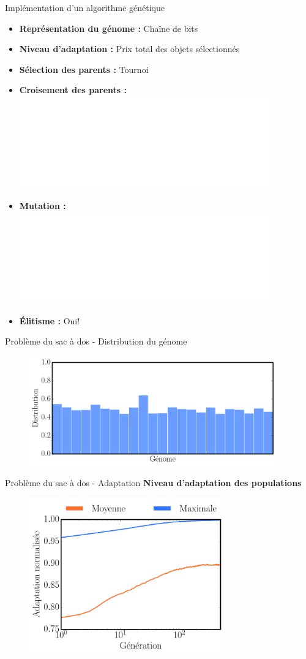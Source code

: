 \begin{frame}{Implémentation d'un algorithme génétique}
\vspace{-10pt}
\begin{itemize}
  \item \textbf{Représentation du génome : } Chaîne de bits
  \item \textbf{Niveau d'adaptation :} Prix total des objets sélectionnés 
  \item \textbf{Sélection des parents : } Tournoi
  \item \textbf{Croisement des parents : } \\ \vspace{5pt}
  \includegraphics<1>[width=0.85\textwidth]{figures/croisement.pdf}
  \item \textbf{Mutation :} \\ \vspace{5pt}
  \includegraphics<1>[width=0.85\textwidth]{figures/mutation.pdf}
  \item \textbf{Élitisme :} Oui!
\end{itemize}
  
\end{frame}

\begin{frame}{Problème du sac à dos - Distribution du génome}
  \begin{figure}[h!]
    \centering
    \href{run:figures/genome_dist.mp4}{\includegraphics[width=0.95\textwidth]{figures/genome_dist.pdf}}
  \end{figure}
\end{frame}

\begin{frame}{Problème du sac à dos - Adaptation}
\vspace{-10pt}
\textbf{Niveau d'adaptation des populations}
  \begin{figure}[h!]
    \centering
    \includegraphics[width=0.75\textwidth]{figures/knapsack_adaptation.pdf}
  \end{figure}
\end{frame}